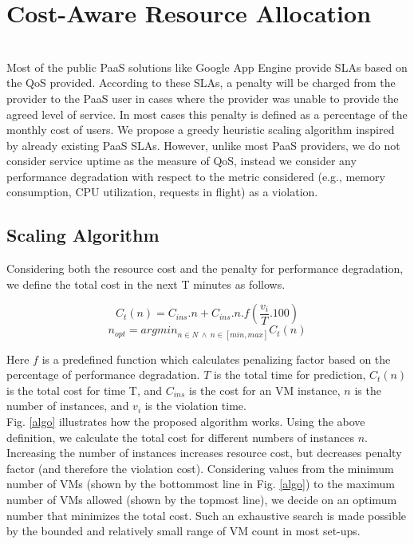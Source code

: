 \section{Cost-Aware Resource Allocation}\\
Most of the public PaaS solutions like Google App Engine provide SLAs based on the QoS provided. According to these SLAs, a penalty will be charged from the provider to the PaaS user in cases where the provider was unable to provide the agreed level of service. In most cases this penalty is defined as a percentage of the monthly cost of users. We propose a greedy heuristic scaling algorithm inspired by already existing PaaS SLAs. However, unlike most PaaS providers, we do not consider service uptime as the measure of QoS, instead we consider any performance degradation with respect to the metric considered (e.g., memory consumption, CPU utilization, requests in flight) as a violation.\\

\subsection{Scaling Algorithm}
Considering both the resource cost and the penalty for performance degradation, we define the total cost in the next T minutes as follows.

\textbf{$$ C_t(n) = C_{ins}.n  + C_{ins} . n . f(\frac{v_i}{T}.100) $$}
\textbf{$$n_{opt} = argmin_{n \in N \ \land \ n \in [min, max]}C_t(n)$$} 

Here $f$ is a predefined function which calculates penalizing factor based on the percentage of performance degradation. $T$ is the total time for prediction, $C_t(n)$ is the total cost for time T, and $C_{ins}$ is the cost for an VM instance, $n$ is the number of instances, and $v_i$ is the violation time. 
\\
Fig. \ref{algo} illustrates how the proposed algorithm works. Using the above definition, we calculate the total cost for different numbers of instances $n$. Increasing the number of instances increases resource cost, but decreases penalty factor (and therefore the violation cost). Considering values from the minimum number of VMs (shown by the bottommost line in Fig. \ref{algo}) to the maximum number of VMs allowed (shown by the topmost line), we decide on an optimum number that minimizes the total cost. Such an exhaustive search is made possible by the bounded and relatively small range of VM count in most set-ups.